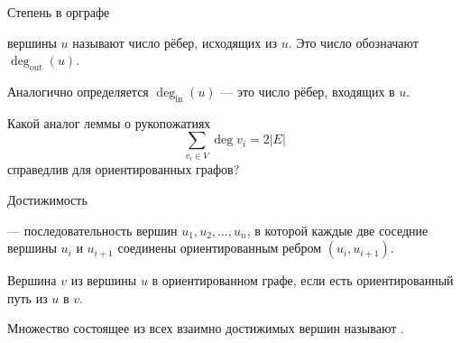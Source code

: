 \begin{frame}{Степень в орграфе}

 {} вершины $u$ называют число рёбер, исходящих
из $u$. Это число обозначают $\deg_{\operatorname{out}} (u)$.

 Аналогично определяется  $\deg_{\operatorname{in}} (u)$ --- это число рёбер, входящих в $u$.

\exmpl Какой аналог леммы о рукопожатиях
$$\sum_{v_i\in V}\deg v_i=2|E|$$ 
справедлив для ориентированных графов?

\end{frame}


\begin{frame}{Достижимость}

 {} --- последовательность вершин $u_1 ,u_2 ,\ldots,u_n$, в которой каждые две соседние вершины $u_i$ и $u_{i+1}$ соединены ориентированным ребром $(u_i,u_{i+1})$.

 Вершина $v$  из вершины $u$ в ориентированном графе, если есть ориентированный путь из $u$ в $v$.

 Множество состоящее из всех взаимно достижимых вершин называют .

\end{frame}


